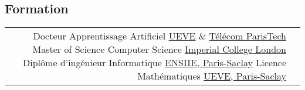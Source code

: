 \documentclass[10pt]{article} %
\begin{document}
\begin{paracol}{2}
\par
%
%
\switchcolumn %
%
%
\section{Formation}
%
%
%
%
%
\begin{supertabular}{rl} %
%
%
    {Docteur} %
    {} %
    {Apprentissage Artificiel} %
    {\href{https://www.ibisc.univ-evry.fr/}{UEVE} \&
     \href{https://ltci.telecom-paristech.fr/}{T\'el\'ecom ParisTech}}
%
%
    {Master of Science} %
    {} %
    {Computer Science} %
    {\href{http://www.imperial.ac.uk/computing}{Imperial College London}} %
%
%
    {Diplôme d'ingénieur} %
    {} %
    {Informatique} %
    {\href{http://www.ensiie.fr/}{ENSIIE, Paris-Saclay}}
%
%
    {Licence} %
    {} %
    {Mathématiques} %
    {\href{https://www.univ-evry.fr/accueil.html}{UEVE, Paris-Saclay}}
%
%
\end{supertabular}
%
%

\end{paracol}
\end{document}
